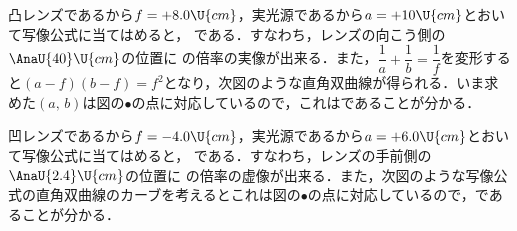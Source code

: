 \begin{reidaiunit}
\begin{kaitou}
\begin{komon}
 凸レンズであるから$f=+8.0\U{cm}$，実光源であるから$a=+10\U{cm}$とおいて写像公式に当てはめると，
       である．すなわち，レンズの向こう側の$\AnaU{40}\U{cm}$の位置に
       の倍率の実像が出来る．また，$\dfrac{1}{a}+\dfrac{1}{b}=\dfrac{1}{f}$を変形すると$(a-f)(b-f)=f^2$となり，次図のような直角双曲線が得られる．いま求めた$(a,\,b)$は図の$\bullet$の点に対応しているので，これはであることが分かる．
       \begin{center}\end{center}
 凹レンズであるから$f=-4.0\U{cm}$，実光源であるから$a=+6.0\U{cm}$とおいて写像公式に当てはめると，
       である．すなわち，レンズの手前側の$\AnaU{2.4}\U{cm}$の位置に
       の倍率の虚像が出来る．また，次図のような写像公式の直角双曲線のカーブを考えるとこれは図の$\bullet$の点に対応しているので，であることが分かる．
       \begin{center}\end{center}
\end{komon}
\end{kaitou}
\end{reidaiunit}

